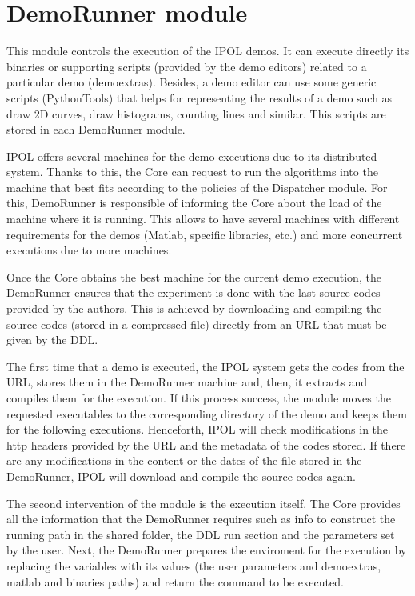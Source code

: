 
\section{DemoRunner module}
\label{sec:DemoRunner}

This module controls the execution of the IPOL demos. It can execute directly its binaries or supporting scripts (provided by the demo editors) related to a particular demo (demoextras). Besides, a demo editor can use some generic scripts (PythonTools) that helps for representing the results of a demo such as draw 2D curves, draw histograms, counting lines and similar. This scripts are stored in each DemoRunner module. 

IPOL offers several machines for the demo executions due to its distributed system. Thanks to this, the Core can request to run the algorithms into the machine that best fits according to the policies of the Dispatcher module. For this, DemoRunner is responsible of informing the Core about the load of the machine where it is running. This allows to have several machines with different requirements for the demos (Matlab, specific libraries, etc.) and more concurrent executions due to more machines. 

Once the Core obtains the best machine for the current demo execution, the DemoRunner ensures that the experiment is done with the last source codes provided by the authors. This is achieved by downloading and compiling the source codes (stored in a compressed file) directly from an URL that must be given by the DDL.

The first time that a demo is executed, the IPOL system gets the codes from the URL, stores them in the DemoRunner machine and, then, it extracts and compiles them for the execution. If this process success, the module moves the requested executables to the corresponding directory of the demo and keeps them for the following executions. Henceforth, IPOL will check modifications in the http headers provided by the URL and the metadata of the codes stored. If there are any modifications in the content or the dates of the file stored in the DemoRunner, IPOL will download and compile the source codes again. 

The second intervention of the module is the execution itself. The Core provides all the information that the DemoRunner requires such as info to construct the running path in the shared folder, the DDL run section and the parameters set by the user. Next, the DemoRunner prepares the enviroment for the execution by replacing the variables with its values (the user parameters and demoextras, matlab and binaries paths) and return the command to be executed. 

